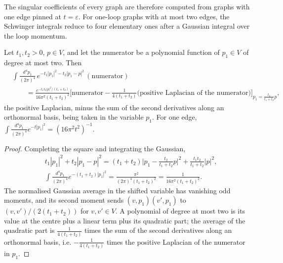 
The singular coefficients of every graph are therefore computed from graphs with one edge pinned at $t=\varepsilon$. For one-loop graphs with at most two edges, the Schwinger integrals reduce to four elementary ones after a Gaussian integral over the loop momentum.

\begin{lemma}
\label{lem:c4-gauss}
Let $t_1,t_2>0$, $p\in V$, and let the numerator be a polynomial function of $p_1\in V$ of degree at most two. Then
\[
\begin{aligned}
&\int\frac{d^4p_1}{(2\pi)^4}\,e^{-t_1|p_1|^2-t_2|p_1-p|^2}\,(\text{numerator})\\
&\qquad=\frac{e^{-t_1t_2|p|^2/(t_1+t_2)}}{16\pi^2(t_1+t_2)^2}\Big[\text{numerator}-\frac{1}{4(t_1+t_2)}\big(\text{positive Laplacian of the numerator}\big)\Big]_{p_1=\frac{t_2}{t_1+t_2}p},
\end{aligned}
\]
the positive Laplacian, minus the sum of the second derivatives along an orthonormal basis, being taken in the variable $p_1$.
For one edge, $\int\frac{d^4p_1}{(2\pi)^4}e^{-t|p_1|^2}=(16\pi^2t^2)^{-1}$.
\end{lemma}

\begin{proof}
Completing the square and integrating the Gaussian,
\[
\begin{aligned}
&t_1|p_1|^2+t_2|p_1-p|^2=(t_1+t_2)\Big|p_1-\tfrac{t_2}{t_1+t_2}p\Big|^2+\tfrac{t_1t_2}{t_1+t_2}|p|^2,\\
&\int\frac{d^4p_1}{(2\pi)^4}e^{-(t_1+t_2)|p_1|^2}=\frac{\pi^2}{(2\pi)^4(t_1+t_2)^2}=\frac1{16\pi^2(t_1+t_2)^2}.
\end{aligned}
\] The normalised Gaussian average in the shifted variable has vanishing odd moments, and its second moment sends $(v,p_1)(v',p_1)$ to $(v,v')/(2(t_1+t_2))$ for $v,v'\in V$. A polynomial of degree at most two is its value at the centre plus a linear term plus its quadratic part; the average of the quadratic part is $\frac{1}{4(t_1+t_2)}$ times the sum of the second derivatives along an orthonormal basis, i.e. $-\frac{1}{4(t_1+t_2)}$ times the positive Laplacian of the numerator in $p_1$.
\end{proof}

